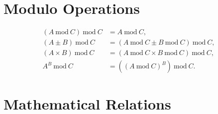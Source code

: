 \section{Modulo Operations}
\label{misc:modulo}

\begin{subequations}\label{eq:misc:modulo}
\begin{align}
\left(A~\text{mod}~C\right)~\text{mod}~C &= A~\text{mod}~C, \label{eq:misc:modulo:basic} \\
\left(A \pm B\right)~\text{mod}~C &= \left(A~\text{mod}~C \pm B~\text{mod}~C\right)~\text{mod}~C, \label{eq:misc:modulo:pm} \\
\left(A \times B\right)~\text{mod}~C &= \left(A~\text{mod}~C \times B~\text{mod}~C\right)~\text{mod}~C, \label{eq:misc:modulo:multiplication} \\
A^{B}~\text{mod}~C &= \left(\left(A~\text{mod}~C\right)^{B}\right)~\text{mod}~C. \label{eq:misc:modulo:exp}
\end{align}
\end{subequations}

\section{Mathematical Relations}
\label{misc:math}

